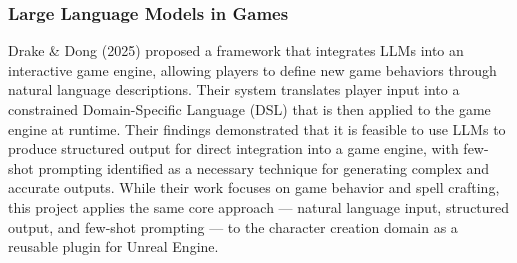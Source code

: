 \subsubsection{Large Language Models in Games}

Drake \& Dong (2025) \cite{drake2025realtimeworldcraftinggenerating} proposed a framework that integrates LLMs into an interactive game engine, allowing players to define new game behaviors through natural language descriptions. Their system translates player input into a constrained Domain-Specific Language (DSL) that is then applied to the game engine at runtime. Their findings demonstrated that it is feasible to use LLMs to produce structured output for direct integration into a game engine, with few-shot prompting identified as a necessary technique for generating complex and accurate outputs. While their work focuses on game behavior and spell crafting, this project applies the same core approach — natural language input, structured output, and few-shot prompting — to the character creation domain as a reusable plugin for Unreal Engine. \newline


